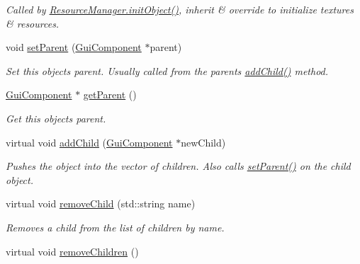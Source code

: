 \begin{DoxyCompactItemize}
\begin{DoxyCompactList}\small\item\em Called by \mbox{\hyperlink{class_resource_manager_ad543c034d0cef8fd2f3e8f32b49ebb3f}{Resource\+Manager.\+init\+Object()}}, inherit \& override to initialize textures \& resources. \end{DoxyCompactList}\item 
void \mbox{\hyperlink{class_gui_component_a526481fb2424c1ea771e78be27a091f9}{set\+Parent}} (\mbox{\hyperlink{class_gui_component}{Gui\+Component}} $\ast$parent)
\begin{DoxyCompactList}\small\item\em Set this object\textquotesingle{}s parent. Usually called from the parent\textquotesingle{}s \mbox{\hyperlink{class_gui_component_a5bccaccef3d0eab8af3be84cab1300de}{add\+Child()}} method. \end{DoxyCompactList}\item 
\mbox{\hyperlink{class_gui_component}{Gui\+Component}} $\ast$ \mbox{\hyperlink{class_gui_component_aba1969f731ef56396a1e69e50ff1f8fb}{get\+Parent}} ()
\begin{DoxyCompactList}\small\item\em Get this object\textquotesingle{}s parent. \end{DoxyCompactList}\item 
virtual void \mbox{\hyperlink{class_gui_component_a5bccaccef3d0eab8af3be84cab1300de}{add\+Child}} (\mbox{\hyperlink{class_gui_component}{Gui\+Component}} $\ast$new\+Child)
\begin{DoxyCompactList}\small\item\em Pushes the object into the vector of children. Also calls \mbox{\hyperlink{class_gui_component_a526481fb2424c1ea771e78be27a091f9}{set\+Parent()}} on the child object. \end{DoxyCompactList}\item 
virtual void \mbox{\hyperlink{class_gui_component_ac979fb459db6feda90bc7c11a6a60623}{remove\+Child}} (std\+::string name)
\begin{DoxyCompactList}\small\item\em Removes a child from the list of children by name. \end{DoxyCompactList}\item 
\mbox{\label{class_gui_component_ac8fea01fa84d85bc1e511211f74cfd53}} 
virtual void \mbox{\hyperlink{class_gui_component_ac8fea01fa84d85bc1e511211f74cfd53}{remove\+Children}} ()

\end{DoxyCompactItemize}
